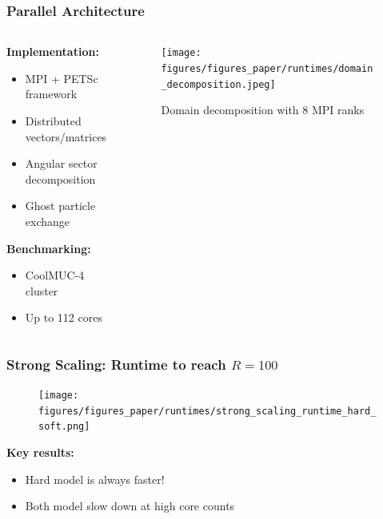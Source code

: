\documentclass[10pt,t]{beamer}
\begin{document}
\begin{frame}
    \frametitle{Parallel Architecture}

    \begin{columns}
        \begin{column}{0.5\textwidth}
            \textbf{Implementation:}
            \begin{itemize}
                \item MPI + PETSc framework
                \item Distributed vectors/matrices
                \item Angular sector decomposition
                \item Ghost particle exchange
            \end{itemize}

            \vspace{0.3cm}

            \textbf{Benchmarking:}
            \begin{itemize}
                \item CoolMUC-4 cluster
                \item Up to 112 cores
            \end{itemize}
        \end{column}

        \begin{column}{0.5\textwidth}
            \vspace{-1cm}
            \begin{figure}
                \centering
                \texttt{[image: figures/figures\_paper/runtimes/domain\_decomposition.jpeg]}
                \caption*{\scriptsize{Domain decomposition with 8 MPI ranks}}
            \end{figure}
        \end{column}
    \end{columns}

\end{frame}

\begin{frame}
    \frametitle{Strong Scaling: Runtime to reach $R=100$}

    \begin{figure}
        \centering
        \texttt{[image: figures/figures\_paper/runtimes/strong\_scaling\_runtime\_hard\_soft.png]}
    \end{figure}

    \textbf{Key results:}
    \begin{itemize}
        \item Hard model is always faster!
        \item Both model slow down at high core counts
    \end{itemize}

\end{frame}
\end{document}
